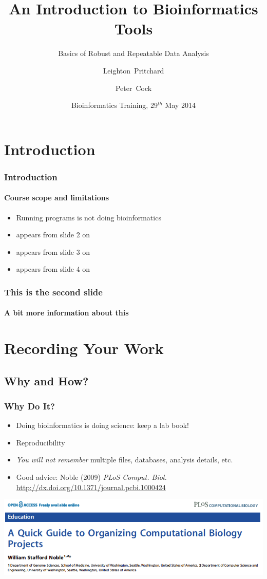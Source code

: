 \documentclass{beamer}
\title[Intro to Bioinformatics] %
{An Introduction to Bioinformatics Tools}
\subtitle{Basics of Robust and Repeatable Data Analysis}
\author[Pritchard, Cock] %
{Leighton~Pritchard \and Peter~Cock}
\institute[The James Hutton Institute] %
{
  Information and Computational Sciences\\
  The James Hutton Institute
}
\date[May 2014] %
{Bioinformatics Training, 29$^{th}$ May 2014}
\begin{document}
  \frame[plain]{\titlepage}

  \section{Introduction}
  \begin{frame}
    \frametitle{Introduction}
    \framesubtitle{Course scope and limitations}
    \begin{itemize}
	\item<1-> Running programs is not doing bioinformatics
	\item<2-> appears from slide 2 on
	\item<3-> appears from slide 3 on
	\item<4-> appears from slide 4 on
	\end{itemize}
  \end{frame}

  \begin{frame}
    \frametitle{This is the second slide}
    \framesubtitle{A bit more information about this}
  \end{frame}

   \section{Recording Your Work}
   
   \subsection{Why and How?}
   \begin{frame}
     \frametitle{Why Do It?}
     \begin{itemize}
	   \item Doing bioinformatics is doing science: keep a lab book!
	   \item Reproducibility
	   \item \textit{You will not remember} multiple files, databases, analysis details, etc.
	   \item Good advice: Noble (2009) \textit{PLoS Comput. Biol.} \url{http://dx.doi.org/10.1371/journal.pcbi.1000424}
	\end{itemize}
	\includegraphics[width=.75\textwidth]{images/noble_2009_head}
   \end{frame}
   
\end{document}
